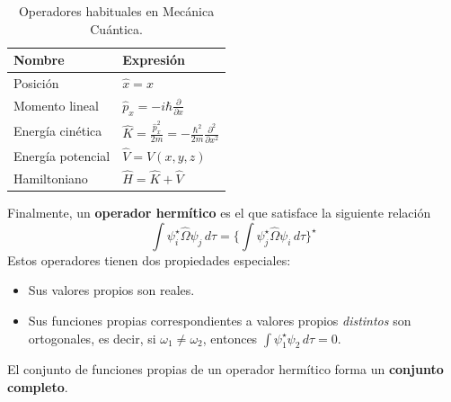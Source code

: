 \documentclass{tufte-handout}
\begin{document}
\begin{table}[h]
  \begin{center}
    \small
    \begin{tabular}{ll}
      \toprule
      Nombre & Expresión \\
      \midrule
      Posición & $\hat{x}=x$ \\
      Momento lineal & $\hat{p}_x=-i\hbar \frac{\partial}{\partial x}$ \\
      Energía cinética & $\hat{K}=\frac{\hat{p}_x^2}{2m}=
      -\frac{\hbar^2}{2m}\frac{\partial^2}{\partial x^2}$\\
      Energía potencial & $\hat{V}=V(x,y,z)$ \\
      Hamiltoniano & $\hat{H}=\hat{K}+\hat{V}$ \\
      \bottomrule
    \end{tabular}
  \end{center}
  \caption{Operadores habituales en Mecánica Cuántica.}
  \label{tab:operators}
\end{table}

Finalmente, un \textbf{operador hermítico} es el que
satisface la siguiente relación
\begin{equation}
    \int\psi_i^\star\hat{\Omega}\psi_j\,d\tau=
    \bigg\{\int\psi_j^\star\hat{\Omega}\psi_i\,d\tau\bigg\}^\star
\end{equation}
Estos operadores tienen dos propiedades especiales:
\begin{itemize}
    \item Sus valores propios son reales.
    \item Sus funciones propias correspondientes a valores
    propios \emph{distintos} son ortogonales, es decir, si
    $\omega_1\neq\omega_2$, entonces
    $\int\psi_1^\star\psi_2\,d\tau=0$.
\end{itemize}
El conjunto de funciones propias de un operador
hermítico forma un \textbf{conjunto completo}.
\end{document}
